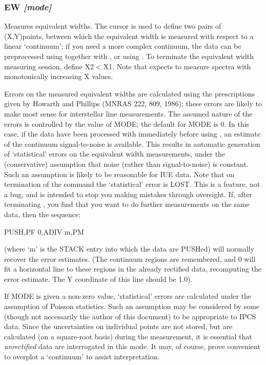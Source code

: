 \documentclass[twoside,11pt,noabs,nolof]{starlink}
\providecommand{\dipcom}[3]{\subsubsection*{\label{COM:#1}\xlabel{COM:#1}\textbf{#1} \emph{#2}}}
\begin{document}
\dipcom{EW}{[mode]}{Measures equivalent widths}
Measures equivalent widths. The cursor is used to define two pairs of
(X,Y)points, between which the equivalent width is measured with
respect to a linear `continuum'; if you need a more complex continuum,
the data can be preprocessed using   together with ,  or using
.  To terminate the equivalent width measuring session, define
X2$<$X1. Note that   expects to measure spectra with monotonically
increasing X values.

Errors on the measured equivalent widths are calculated using the
prescriptions given by Howarth and Phillips (MNRAS 222, 809, 1986);
these errors are likely to make most sense for interstellar line
measurements. The assumed nature of the errors is controlled by the
value of MODE; the default for MODE is 0. In this case, if the data
have been processed with   immediately before using ,  an estimate
of the continuum signal-to-noise is available. This results in
automatic generation of `statistical' errors on the equivalent width
measurements, under the (conservative) assumption that noise (rather
than signal-to-noise) is constant. Such an assumption is likely to be
reasonable for IUE data. Note that on termination of the   command
the `statistical' error is LOST. This is a feature, not a bug, and is
intended to stop you making mistakes through oversight. If, after
terminating ,  you find that you want to do further measurements on
the same data, then the sequence:

\begin{terminalv}
PUSH,PF 0,ADIV m,PM
\end{terminalv}

(where `m' is the STACK entry into which the data are PUSHed) will
normally recover the error estimates. (The   continuum regions are
remembered, and   0 will fit a horizontal line to these regions in
the already rectified data, recomputing the error estimate. The Y
coordinate of this line should be 1.0).

If MODE is given a non-zero value, `statistical' errors are calculated
under the assumption of Poisson statistics. Such an assumption may be
considered by some (though not necessarily the author of this
document) to be appropriate to IPCS data. Since the uncertainties on
individual points are not stored, but are calculated (on a square-root
basis) during the   measurement, it is essential that \emph{unrectified} data are interrogated in this mode. It may, of course,
prove convenient to overplot a `continuum' to assist interpretation.
\end{document}

